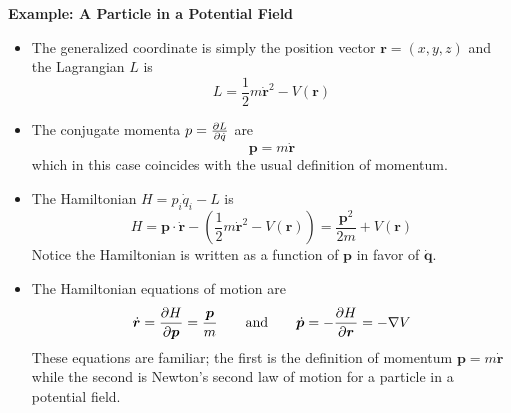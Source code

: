 \documentclass[11pt, a4paper]{article}
\newcommand{\eqtext}[1]{\qquad \text{#1} \qquad}
\newcommand{\bdot}[1]{\dot{\bm{#1}}}
\renewcommand{\grad}{\nabla }
\begin{document}
\textbf{Example: A Particle in a Potential Field}
\begin{itemize}
	\item The generalized coordinate is simply the position vector $ \bm{r} = (x, y, z) $ and the Lagrangian $ L $ is
	\begin{equation*}
		L = \frac{1}{2}m\dot{\bm{r}}^{2} - V(\bm{r})
	\end{equation*}
	
	\item The conjugate momenta $ p = \pdv{L}{\dot{q}} $ are
	\begin{equation*}
		\bm{p} = m \dot{\bm{r}}
	\end{equation*}
	which in this case coincides with the usual definition of momentum.
	
	\item The Hamiltonian $ H = p_{i}\dot{q}_{i} - L $ is
	\begin{equation*}
		H = \bm{p}\cdot \dot{\bm{r}} - \left(\frac{1}{2}m\dot{\bm{r}}^{2} - V(\bm{r})\right) = \frac{\bm{p}^{2}}{2m} + V(\bm{r})
	\end{equation*}
	Notice the Hamiltonian is written as a function of $ \bm{p} $ in favor of $ \dot{\bm{q}} $.
	
	\item The Hamiltonian equations of motion are 
	\begin{equation*}
		\bdot{r} = \pdv{H}{\bm{p}} = \frac{\bm{p}}{m} \eqtext{and} \bdot{p} = - \pdv{H}{\bm{r}} = - \grad V
	\end{equation*}
	These equations are familiar; the first is the definition of momentum $ \bm{p} = m \bdot{r} $ while the second is Newton's second law of motion for a particle in a potential field.

\end{itemize}
\end{document}
